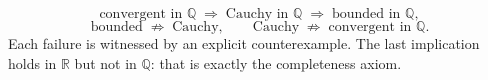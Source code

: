 \begin{remark*}
\[
\text{convergent in } \mathbb{Q}
\;\Longrightarrow\;
\text{Cauchy in } \mathbb{Q}
\;\Longrightarrow\;
\text{bounded in } \mathbb{Q},
\]
\[
\text{bounded}
\;\not\Longrightarrow\;
\text{Cauchy},
\qquad
\text{Cauchy}
\;\not\Longrightarrow\;
\text{convergent in } \mathbb{Q}.
\]
Each failure is witnessed by an explicit counterexample. The last implication
holds in $\mathbb{R}$ but not in $\mathbb{Q}$: that is exactly the completeness
axiom.
\end{remark*}
